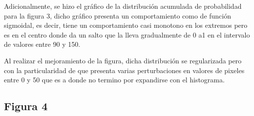 \documentclass[11pt, letterpaper]{article}
\begin{document}
Adicionalmente, se hizo el gráfico de la distribución acumulada de probabilidad para la figura 3, dicho gráfico presenta un comportamiento como de función sigmoidal, es decir, tiene un comportamiento casi monotono en los extremos pero es en el centro donde da un salto que la lleva gradualmente de 0 a1 en el intervalo de valores entre 90 y 150.

Al realizar el mejoramiento de la figura, dicha distribución  se regularizada pero con la particularidad de que presenta varias perturbaciones en valores de pixeles entre 0 y 50 que es a donde no termino por expandirse con el histograma.


\newpage
	
\subsection{Figura 4}
\end{document}

